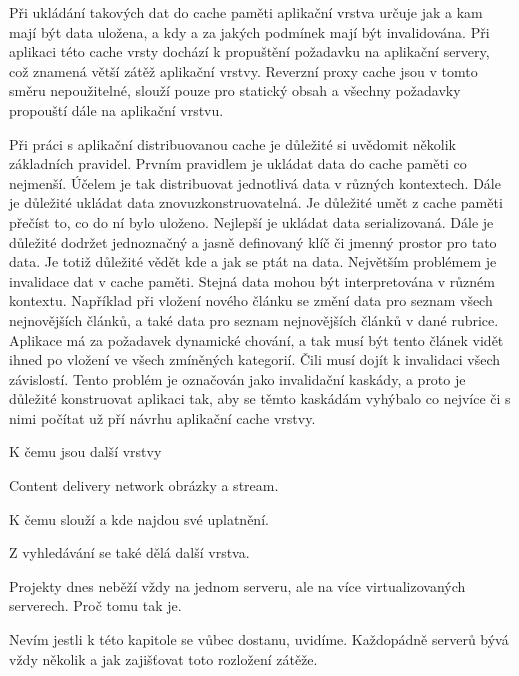 \documentclass[12pt]{article}
\begin{document}
Při ukládání takových dat do cache paměti aplikační vrstva určuje jak a kam mají být data uložena, a kdy a za jakých podmínek mají být invalidována. Při aplikaci této cache vrsty dochází k propuštění požadavku na aplikační servery, což znamená větší zátěž aplikační vrstvy. Reverzní proxy cache jsou v tomto směru nepoužitelné, slouží pouze pro statický obsah a všechny požadavky propouští dále na aplikační vrstvu.

Při práci s aplikační distribuovanou cache je důležité si uvědomit několik základních pravidel. Prvním pravidlem je ukládat data do cache paměti co nejmenší. Účelem je tak distribuovat jednotlivá data v různých kontextech. Dále je důležité ukládat data znovuzkonstruovatelná. Je důležité umět z cache paměti přečíst to, co do ní bylo uloženo. Nejlepší je ukládat data serializovaná. Dále je důležité dodržet jednoznačný a jasně definovaný klíč či jmenný prostor pro tato data. Je totiž důležité vědět kde a jak se ptát na data. Největším problémem je invalidace dat v cache paměti. Stejná data mohou být interpretována v různém kontextu. Například při vložení nového článku se změní data pro seznam všech nejnovějších článků, a také data pro seznam nejnovějších článků v dané rubrice. Aplikace má za požadavek dynamické chování, a tak musí být tento článek vidět ihned po vložení ve všech zmíněných kategorií. Čili musí dojít k invalidaci všech závislostí. Tento problém je označován jako invalidační kaskády, a proto je důležité konstruovat aplikaci tak, aby se těmto kaskádám vyhýbalo co nejvíce či s nimi počítat už pří návrhu aplikační cache vrstvy.

\obrazek
{}



K čemu jsou další vrstvy

Content delivery network obrázky a stream.

K čemu slouží a kde najdou své uplatnění.

Z vyhledávání se také dělá další vrstva.



Projekty dnes neběží vždy na jednom serveru, ale na více virtualizovaných serverech. Proč tomu tak je.


Nevím jestli k této kapitole se vůbec dostanu, uvidíme. Každopádně serverů bývá vždy několik a jak zajišťovat toto rozložení zátěže.
\end{document}
